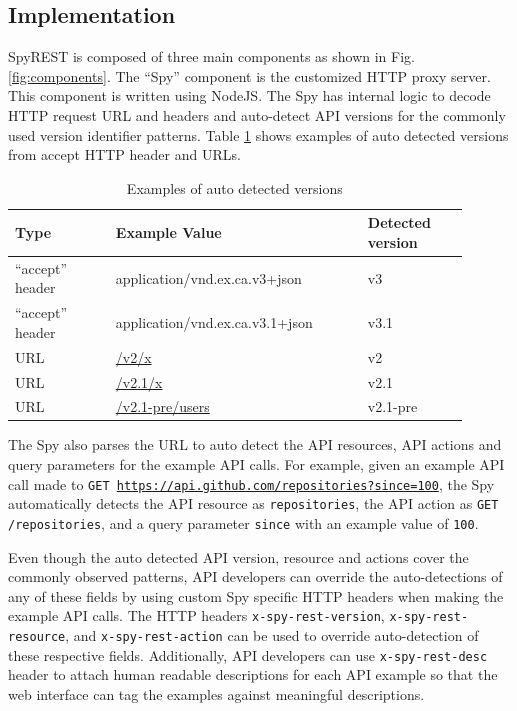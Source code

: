 \documentclass[conference]{IEEEtran}
\begin{document}
\subsection{Implementation} %
\label{sub:implementation}

SpyREST is composed of three main components as shown in Fig. \ref{fig:components}. The ``Spy'' component is the customized HTTP proxy server. This component is written using NodeJS. The Spy has internal logic to decode HTTP request URL and headers and auto-detect API versions for the commonly used version identifier patterns. Table \ref{table:versions} shows examples of auto detected versions from accept HTTP header and URLs.

\begin{table}[!tbh]
  \caption{Examples of auto detected versions}
  \begin{tabular}{|p{0.2\linewidth}|p{0.5\linewidth}|p{0.2\linewidth}|}
    \hline
    \textbf{Type} & \textbf{Example Value} & \textbf{Detected version}\\
    \hline
    ``accept'' header & application/vnd.ex.ca.v3+json & v3\\
    \hline
    ``accept'' header & application/vnd.ex.ca.v3.1+json & v3.1\\
    \hline
    URL & \url{/v2/x} & v2\\
    \hline
    URL & \url{/v2.1/x} & v2.1\\
    \hline
    URL & \url{/v2.1-pre/users} & v2.1-pre\\
    \hline
  \end{tabular}
  \label{table:versions}
\end{table}

The Spy also parses the URL to auto detect the API resources, API actions and query parameters for the example API calls. For example, given an example API call made to \texttt{GET \url{https://api.github.com/repositories?since=100}}, the Spy automatically detects the API resource as \texttt{repositories}, the API action as \texttt{GET /repositories}, and a query parameter \texttt{since} with an example value of \texttt{100}.

Even though the auto detected API version, resource and actions cover the commonly observed patterns, API developers can override the auto-detections of any of these fields by using custom Spy specific HTTP headers when making the example API calls. The HTTP headers \texttt{x-spy-rest-version}, \texttt{x-spy-rest-resource}, and \texttt{x-spy-rest-action} can be used to override auto-detection of these respective fields. Additionally, API developers can use \texttt{x-spy-rest-desc} header to attach human readable descriptions for each API example so that the web interface can tag the examples against meaningful descriptions.
\end{document}
